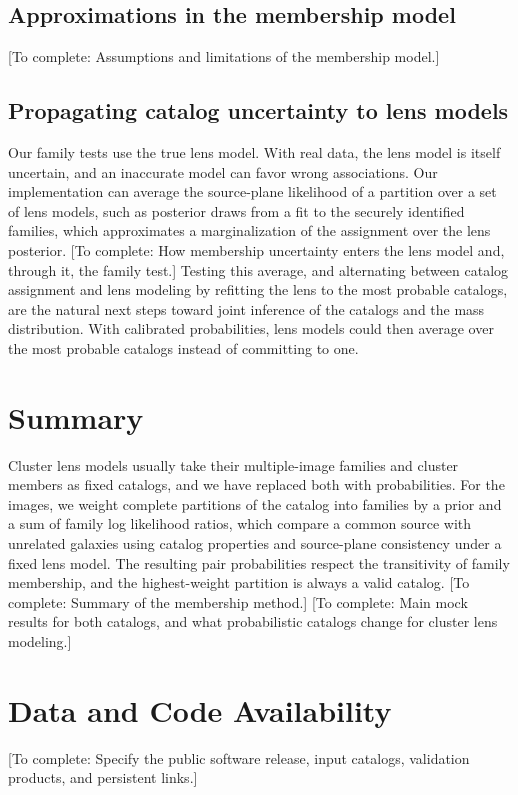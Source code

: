 \documentclass[twocolumn,twocolappendix,linenumbers]{aastex701}
\newcommand{\todo}[1]{\textcolor{red!65!black}{[To complete: #1]}}
\begin{document}
\subsection{Approximations in the membership model}
\label{sec:disc_members}
\todo{Assumptions and limitations of the membership model.}

\subsection{Propagating catalog uncertainty to lens models}
\label{sec:disc_lens}
Our family tests use the true lens model.
With real data, the lens model is itself uncertain, and an inaccurate model can favor wrong associations.
Our implementation can average the source-plane likelihood of a partition over a set of lens models, such as posterior draws from a fit to the securely identified families, which approximates a marginalization of the assignment over the lens posterior.
\todo{How membership uncertainty enters the lens model and, through it, the family test.}
Testing this average, and alternating between catalog assignment and lens modeling by refitting the lens to the most probable catalogs, are the natural next steps toward joint inference of the catalogs and the mass distribution.
With calibrated probabilities, lens models could then average over the most probable catalogs instead of committing to one.

\section{Summary}
\label{sec:summary}
Cluster lens models usually take their multiple-image families and cluster members as fixed catalogs, and we have replaced both with probabilities.
For the images, we weight complete partitions of the catalog into families by a prior and a sum of family log likelihood ratios, which compare a common source with unrelated galaxies using catalog properties and source-plane consistency under a fixed lens model.
The resulting pair probabilities respect the transitivity of family membership, and the highest-weight partition is always a valid catalog.
\todo{Summary of the membership method.}
\todo{Main mock results for both catalogs, and what probabilistic catalogs change for cluster lens modeling.}

\section*{Data and Code Availability}
\todo{Specify the public software release, input catalogs, validation products, and persistent links.}
\end{document}
